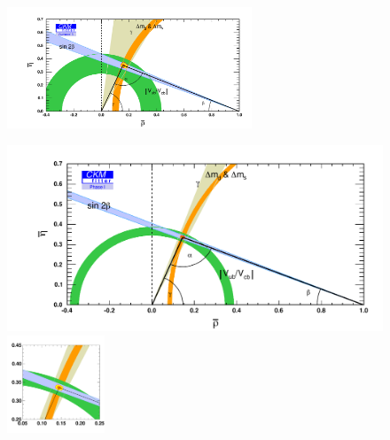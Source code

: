 \begin{figure}[t]
\begin{center}
\includegraphics[width=0.65\textwidth]{Flavour/figs/rhoeta_small_LHCb_Summer18.pdf}

\begin{minipage}{0.65\textwidth}
\includegraphics[width=\textwidth]{Flavour/figs/rhoeta_small_LHCb_Stage1.pdf}\vspace{-5.36cm}
\mbox{\hspace{7.9cm}\includegraphics[width=0.26\textwidth]{Flavour/figs/rhoeta_small_zoom_LHCb_Stage1.pdf}}
\vspace{2.25cm}
\end{minipage}


\end{center}
\end{figure}
